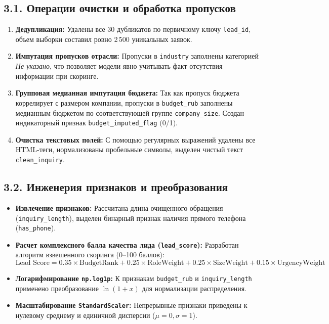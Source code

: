 \documentclass[12pt,a4paper]{article}
\begin{document}
	\subsection*{3.1. Операции очистки и обработка пропусков}
	\begin{enumerate}[noitemsep,topsep=1pt]
		\item \textbf{Дедупликация:} Удалены все 30 дубликатов по первичному ключу \texttt{lead\_id}, объем выборки составил ровно 2\,500 уникальных заявок.
		\item \textbf{Импутация пропусков отрасли:} Пропуски в \texttt{industry} заполнены категорией \textit{\guillemotleft Не указано\guillemotright}, что позволяет модели явно учитывать факт отсутствия информации при скоринге.
		\item \textbf{Групповая медианная импутация бюджета:} Так как пропуск бюджета коррелирует с размером компании, пропуски в \texttt{budget\_rub} заполнены медианным бюджетом по соответствующей группе \texttt{company\_size}. Создан индикаторный признак \texttt{budget\_imputed\_flag} (0/1).
		\item \textbf{Очистка текстовых полей:} С помощью регулярных выражений удалены все HTML-теги, нормализованы пробельные символы, выделен чистый текст \texttt{clean\_inquiry}.
	\end{enumerate}

	\subsection*{3.2. Инженерия признаков и преобразования}
	\begin{itemize}[noitemsep,topsep=1pt]
		\item \textbf{Извлечение признаков:} Рассчитана длина очищенного обращения (\texttt{inquiry\_length}), выделен бинарный признак наличия прямого телефона (\texttt{has\_phone}).
		\item \textbf{Расчет комплексного балла качества лида (\texttt{lead\_score}):} Разработан алгоритм взвешенного скоринга (0--100 баллов):
		$$\text{Lead Score} = 0.35 \times \text{BudgetRank} + 0.25 \times \text{RoleWeight} + 0.25 \times \text{SizeWeight} + 0.15 \times \text{UrgencyWeight}$$
		\item \textbf{Логарифмирование \texttt{np.log1p}:} К признакам \texttt{budget\_rub} и \texttt{inquiry\_length} применено преобразование $\ln(1+x)$ для нормализации распределения.
		\item \textbf{Масштабирование \texttt{StandardScaler}:} Непрерывные признаки приведены к нулевому среднему и единичной дисперсии ($\mu = 0, \sigma = 1$).
	\end{itemize}
\end{document}
